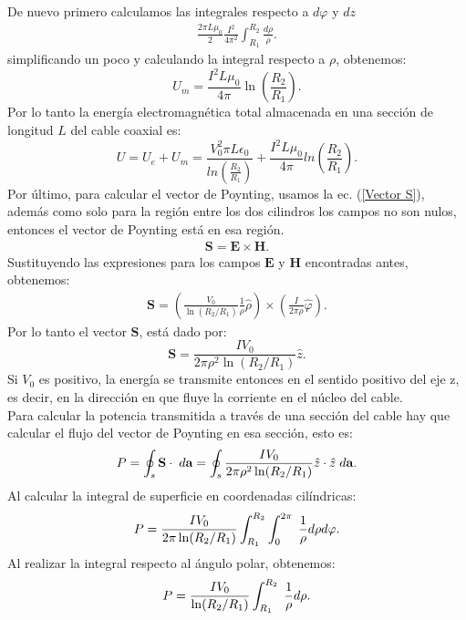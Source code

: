 \documentclass[11pt,fleqn]{book} %
\begin{document}
\begin{example}
De nuevo primero calculamos las integrales respecto a $d\varphi$ y $dz$
\begin{eqnarray*}
\frac{2\pi L \mu_{0}}{2} \frac{I^{2}}{4\pi^{2}}\int_{R_{1}}^{R_{2}} \frac{d\rho}{\rho}.
\end{eqnarray*}
simplificando un poco y calculando la integral respecto a $\rho$, obtenemos:
\begin{equation}
U_{m}=\frac{I^{2} L \mu_{0}}{4\pi} \ln\left( \frac{R_{2}}{R_{1}} \right).
\end{equation}
Por lo tanto la energ\'ia electromagn\'etica total almacenada en una secci\'on de longitud $L$ del cable coaxial es:
\begin{equation}
U=U_{e}+U_{m}=\frac{V_{0}^{2}\pi L\epsilon_{0}}{ln\left( \frac{R_{2}}{R_{1}} \right)}+\frac{I^{2} L \mu_{0}}{4\pi} ln\left( \frac{R_{2}}{R_{1}} \right).
\end{equation}
Por \'ultimo, para calcular el vector de Poynting, usamos la ec. (\ref{Vector S}), adem\'as como solo para la regi\'on entre los dos cilindros los campos no son nulos, entonces el vector de Poynting est\'a en esa regi\'on.
\begin{eqnarray*}
\textbf{S}=\textbf{E}\times\textbf{H}.
\end{eqnarray*}
Sustituyendo las expresiones para los campos $\textbf{E}$ y $\textbf{H}$ encontradas antes, obtenemos:
\begin{eqnarray*}
\textbf{S}=\left( \frac{V_0}{\ln(R_{2}/R_{1})}\frac{1}{\rho}\hat{\rho} \right)\times\left( \frac{I}{2\pi\rho}\hat{\varphi} \right).
\end{eqnarray*}
Por lo tanto el vector $\textbf{S}$, est\'a dado por:
\begin{equation}
\textbf{S}=\frac{IV_0}{2\pi\rho^{2}\ln(R_{2}/R_{1})}\hat{z}.
\end{equation}
Si $V_{0}$ es positivo, la energ\'ia se transmite entonces en el sentido positivo del eje z, es decir, en la direcci\'on en que fluye la corriente en el n\'ucleo del cable.\\
Para calcular la potencia transmitida a trav\'es de una secci\'on del cable hay que calcular el flujo del vector de Poynting en esa secci\'on, esto es:
\begin{eqnarray*}
P=\oint_{s} \textbf{S}\cdot \hspace{1mm}d\textbf{a}=\oint_{s}\frac{IV_0}{2\pi\rho^{2}\ln(R_{2}/R_{1})}\hat{z} \cdot \hat{z}\hspace{1mm}d\textbf{a}.
\end{eqnarray*}
Al calcular la integral de superficie en coordenadas cil\'indricas:
\begin{eqnarray*}
P=\frac{IV_0}{2\pi\ln(R_{2}/R_{1})}\int_{R_{1}}^{R_{2}}\int_{0}^{2\pi}\hspace{1mm}\frac{1}{\rho} d\rho d\varphi.
\end{eqnarray*}
Al realizar la integral respecto al \'angulo polar, obtenemos:
\begin{eqnarray*}
P=\frac{IV_0}{\ln(R_{2}/R_{1})}\int_{R_{1}}^{R_{2}}\hspace{1mm}\frac{1}{\rho} d\rho.
\end{eqnarray*}


\end{example}
\end{document}
